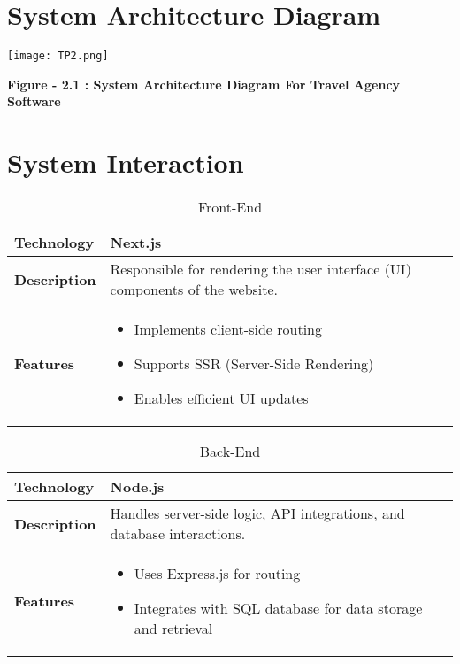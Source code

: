 \documentclass{scrreprt}
\begin{document}
\section{System Architecture Diagram}

{\texttt{[image: TP2.png]}}

\begin{center}
    \parbox{0.8\textwidth}{ 
        \centering
        \textbf{Figure - 2.1 : System Architecture Diagram For Travel Agency Software}
    }
\end{center}


\begin{table}[ht]
    
\section{System Interaction}
    \centering
    \caption{Front-End}
    \begin{tabular}{|p{4cm}|p{10cm}|}
    \hline
    \textbf{Technology} & Next.js \\
    \hline
    \textbf{Description} & Responsible for rendering the user interface (UI) components of the website. \\
    \hline
    \textbf{Features} &
    \begin{itemize}[label=$\bullet$]
      \item Implements client-side routing
      \item Supports SSR (Server-Side Rendering)
      \item Enables efficient UI updates
    \end{itemize} \\
    \hline
    \end{tabular}
    \end{table}
    
    \vspace{0.5cm}
    
    \begin{table}[ht]
    \centering
    \caption{Back-End}
    \begin{tabular}{|p{4cm}|p{10cm}|}
    \hline
    \textbf{Technology} & Node.js \\
    \hline
    \textbf{Description} & Handles server-side logic, API integrations, and database interactions. \\
    \hline
    \textbf{Features} &
    \begin{itemize}[label=$\bullet$]
      \item Uses Express.js for routing
      \item Integrates with SQL database for data storage and retrieval
    \end{itemize} \\
    \hline
    \end{tabular}
    \end{table}
    
\end{document}
